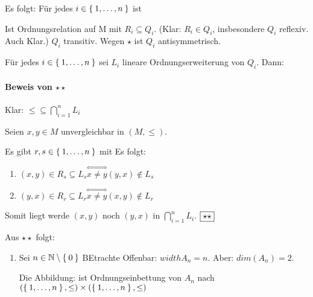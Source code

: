 \documentclass{../../meta/tudscript}
\begin{document}
    Es folgt: Für jedes $i \in \Set{1, \ldots, n}$ ist 
    
    Ist Ordnungsrelation auf M mit $R_i \subseteq Q_i$.
    (Klar: $R_i \in Q_i$, insbesondere $Q_i$ reflexiv. Auch Klar.)
    $Q_i$ transitiv. Wegen $\star$ ist $Q_i$ antisymmetrisch.

    Für jedes $i \in \Set{1, \ldots, n}$ sei $L_i$ lineare Ordnungserweiterung
    von $Q_i$. Dann:

    \paragraph{Beweis von $\star\star$}

    Klar: $\leq \subseteq \bigcap_{i = 1}^n L_i$

    Seien $x,y \in M$ unvergleichbar in $(M, \leq)$.

    Es gibt $r, s \in \Set{1, \ldots, n}$ mit
    Es folgt:
    \begin{enumerate}
        \item $(x,y) \in R_s \subseteq L_s \overset{\iff}{x \neq y} (y,x) \notin L_s$
        \item $(y,x) \in R_r \subseteq L_r \overset{\iff}{x \neq y} (x,y) \notin L_r$
    \end{enumerate}
    Somit liegt werde $(x,y)$ noch $(y,x)$ in $\bigcap_{i = 1}^n L_i$.
    $\hfill\boxed{\star\star}$

    Aus $\star\star$ folgt:

    \begin{enumerate}
        \item Sei $n \in \mathbb{N} \setminus \Set{0}$ BEtrachte
        Offenbar: $width A_n = n$. Aber: $dim (A_n) = 2$.

        Die Abbildung:
        ist Ordnungseinbettung von $A_n$ nach $(\Set{1, \ldots, n}, \leq) \times (\Set{1, \ldots, n}, \leq)$

    \end{enumerate}
    
\end{document}
